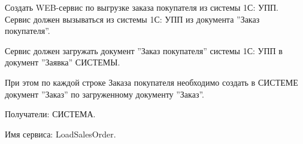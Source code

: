 \label{exchange:LoadSalesOrder}

 Создать WEB-сервис по выгрузке заказа покупателя из системы 1С: УПП.
 Сервис должен вызываться из системы 1С: УПП из документа ''Заказ покупателя''.
 
 
 Сервис должен загружать документ ''Заказ покупателя'' системы 1С: УПП в документ ''Заявка'' СИСТЕМЫ.
 
 При этом по каждой строке Заказа покупателя необходимо создать в СИСТЕМЕ документ ''Заказ'' по загруженному документу ''Заказ''.
 
 Получатели: СИСТЕМА.

 Имя сервиса: LoadSalesOrder.

 




